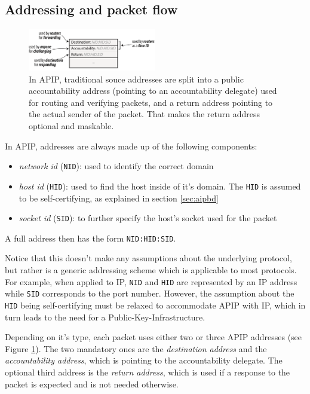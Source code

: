 \documentclass{acm_proc_article-sp}
\begin{document}
\subsection{Addressing and packet flow}
\begin{figure}[h]
  \includegraphics[width=0.5\textwidth]{images/apipaddressing.PNG}
  \caption{In APIP, traditional souce addresses are split into a public accountability address (pointing to an accountability delegate) used for routing and verifying packets, and a return address pointing to the actual sender of the packet. That makes the return address optional and maskable. \cite{apip}}
  \label{fig:apipaddressing}
\end{figure}

In APIP, addresses are always made up of the following components:

\begin{itemize}
\item \emph{network id} (\texttt{NID}): used to identify the correct domain
\item \emph{host id} (\texttt{HID}): used to find the host inside of it's domain. The \texttt{HID} is assumed to be self-certifying, as explained in section \ref{sec:aipbd}
\item \emph{socket id} (\texttt{SID}): to further specify the host's socket used for the packet
\end{itemize}

A full address then has the form \texttt{NID:HID:SID}.

Notice that this doesn't make any assumptions about the underlying protocol, but rather is a generic addressing scheme which is applicable to most protocols. For example, when applied to IP, \texttt{NID} and \texttt{HID} are represented by an IP address while \texttt{SID} corresponds to the port number. However, the assumption about the \texttt{HID} being self-certifying must be relaxed to accommodate APIP with IP, which in turn leads to the need for a Public-Key-Infrastructure. 

Depending on it's type, each packet uses either two or three APIP addresses (see Figure \ref{fig:apipaddressing}). The two mandatory ones are the \emph{destination address} and the \emph{accountability address}, which is pointing to the accountability delegate. The optional third address is the \emph{return address}, which is used if a response to the packet is expected and is not needed otherwise.
\end{document}
